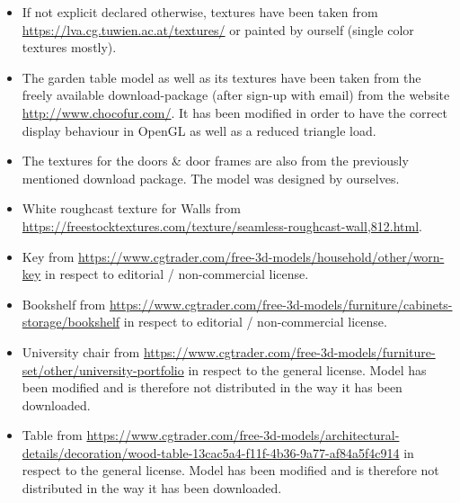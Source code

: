 \documentclass[12pt]{article}
\begin{document}
\begin{itemize}

\item If not explicit declared otherwise, textures have been taken from
\url{https://lva.cg.tuwien.ac.at/textures/} or painted by ourself (single color textures mostly).

\item The garden table model as well as its textures have been taken from the freely available download-package (after sign-up with email) from the website
\url{http://www.chocofur.com/}. It has been modified in order to have the correct display behaviour in OpenGL as well as a reduced triangle load.

\item The textures for the doors \& door frames are also from the previously mentioned download package. The model was designed by ourselves.


\item White roughcast texture for Walls from \url{https://freestocktextures.com/texture/seamless-roughcast-wall,812.html}.


\item Key from \url{https://www.cgtrader.com/free-3d-models/household/other/worn-key} in respect to editorial / non-commercial license.

\item Bookshelf from \url{https://www.cgtrader.com/free-3d-models/furniture/cabinets-storage/bookshelf} in respect to editorial / non-commercial license.

\item University chair from \url{https://www.cgtrader.com/free-3d-models/furniture-set/other/university-portfolio} in respect to the general license. Model has been modified and is therefore not distributed in the way it has been downloaded.

\item Table from \url{https://www.cgtrader.com/free-3d-models/architectural-details/decoration/wood-table-13cac5a4-f11f-4b36-9a77-af84a5f4c914} in respect to the general license. Model has been modified and is therefore not distributed in the way it has been downloaded.


\end{itemize}
\end{document}
